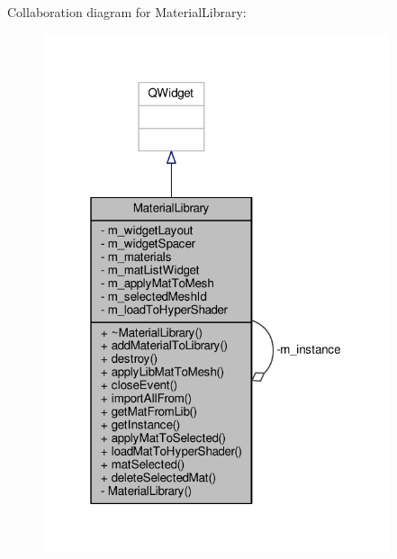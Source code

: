 Collaboration diagram for Material\-Library\-:
\nopagebreak
\begin{figure}[H]
\begin{center}
\leavevmode
\includegraphics[width=289pt]{class_material_library__coll__graph}
\end{center}
\end{figure}
